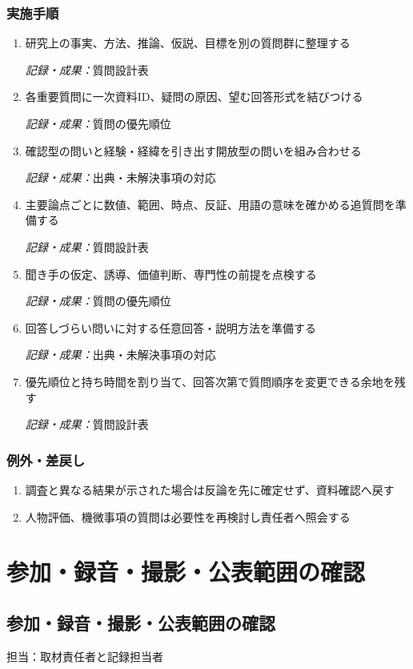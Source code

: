 \documentclass[a4paper,11pt]{article}
\begin{document}
\subsubsection*{実施手順}
\begin{enumerate}[leftmargin=2em,itemsep=0.65em]
\item 研究上の事実、方法、推論、仮説、目標を別の質問群に整理する\par\noindent\textit{記録・成果：}質問設計表\nobreak\smallskip
\item 各重要質問に一次資料ID、疑問の原因、望む回答形式を結びつける\par\noindent\textit{記録・成果：}質問の優先順位\nobreak\smallskip
\item 確認型の問いと経験・経緯を引き出す開放型の問いを組み合わせる\par\noindent\textit{記録・成果：}出典・未解決事項の対応\nobreak\smallskip
\item 主要論点ごとに数値、範囲、時点、反証、用語の意味を確かめる追質問を準備する\par\noindent\textit{記録・成果：}質問設計表\nobreak\smallskip
\item 聞き手の仮定、誘導、価値判断、専門性の前提を点検する\par\noindent\textit{記録・成果：}質問の優先順位\nobreak\smallskip
\item 回答しづらい問いに対する任意回答・説明方法を準備する\par\noindent\textit{記録・成果：}出典・未解決事項の対応\nobreak\smallskip
\item 優先順位と持ち時間を割り当て、回答次第で質問順序を変更できる余地を残す\par\noindent\textit{記録・成果：}質問設計表\nobreak\smallskip
\end{enumerate}
\subsubsection*{例外・差戻し}
\begin{enumerate}[leftmargin=2em,itemsep=0.35em]
\item 調査と異なる結果が示された場合は反論を先に確定せず、資料確認へ戻す
\item 人物評価、機微事項の質問は必要性を再検討し責任者へ照会する
\end{enumerate}
\section{参加・録音・撮影・公表範囲の確認}
\subsection{参加・録音・撮影・公表範囲の確認}
\par 担当：取材責任者と記録担当者\par\medskip
\end{document}
